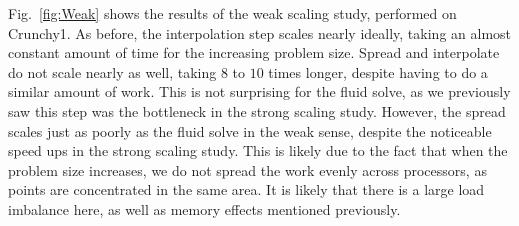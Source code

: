 \documentclass[]{article}
\begin{document}
Fig.\ \ref{fig:Weak} shows the results of the weak scaling study, performed on Crunchy1. As before, the interpolation step scales nearly ideally, taking an almost constant amount of time for the increasing problem size. Spread and interpolate do not scale nearly as well, taking $8$ to $10$ times longer, despite having to do a similar amount of work. This is not surprising for the fluid solve, as we previously saw this step was the bottleneck in the strong scaling study. However, the spread scales just as poorly as the fluid solve in the weak sense, despite the noticeable speed ups in the strong scaling study. This is likely due to the fact that when the problem size increases, we do not spread the work evenly across processors, as points are concentrated in the same area. It is likely that there is a large load imbalance here, as well as memory effects mentioned previously. 







\newpage



\end{document}

